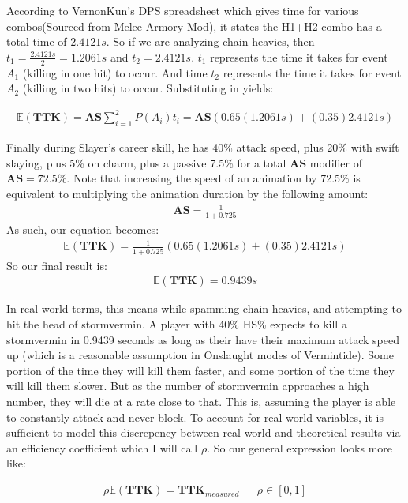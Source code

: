\documentclass{article}
\begin{document}
According to VernonKun's DPS spreadsheet which gives time for various combos(Sourced from Melee Armory Mod), it states the H1+H2 combo has a total time of $2.4121 s$. So if we are analyzing chain heavies, then $t_1=\tfrac{2.4121 s}{2}=1.2061 s$ and $t_2 = 2.4121 s$. $t_1$ represents the time it takes for event $A_1$ (killing in one hit) to occur. And time $t_2$ represents the time it takes for event $A_2$ (killing in two hits) to occur. Substituting in yields:

\begin{align*}
\mathbb{E}(\mathbf{TTK}) = \mathbf{AS} \sum_{i=1}^{2} P(A_i) t_i = \mathbf{AS} (0.65 (1.2061 s) + (0.35) 2.4121 s)
\end{align*}

Finally during Slayer's career skill, he has 40\% attack speed, plus 20\% with swift slaying, plus 5\% on charm, plus a passive 7.5\% for a total \textbf{AS} modifier of $\mathbf{AS}=72.5\%$. Note that increasing the speed of an animation by 72.5\% is equivalent to multiplying the animation duration by the following amount:
\begin{align*}
\mathbf{AS} = \frac{1}{1+0.725}
\end{align*}
As such, our equation becomes:
\begin{align*}
\mathbb{E}(\mathbf{TTK}) = \tfrac{1}{1+0.725} (0.65 (1.2061 s) + (0.35) 2.4121 s)
\end{align*}
So our final result is:
\begin{align*}
\mathbb{E}(\mathbf{TTK}) = 0.9439 s
\end{align*}

In real world terms, this means while spamming chain heavies, and attempting to hit the head of stormvermin. A player with 40\% HS\% expects to kill a stormvermin in 0.9439 seconds as long as their have their maximum attack speed up (which is a reasonable assumption in Onslaught modes of Vermintide). Some portion of the time they will kill them faster, and some portion of the time they will kill them slower. But as the number of stormvermin approaches a high number, they will die at a rate close to that. This is, assuming the player is able to constantly attack and never block. To account for real world variables, it is sufficient to model this discrepency between real world and theoretical results via an efficiency coefficient which I will call $\rho$. So our general expression looks more like:

\begin{align*}
\rho \mathbb{E}(\mathbf{TTK}) = \mathbf{TTK}_{measured} && \rho \in [0,1]
\end{align*}
\end{document}
